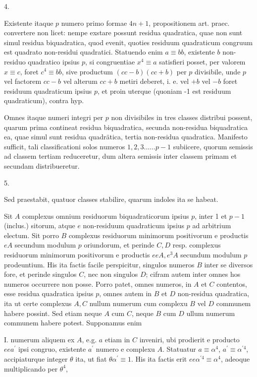 \documentclass[10pt]{article}
\begin{document}
4.

Existente itaque \(p\) numero primo formae \(4 n+1\), propositionem art. praec. convertere non licet: nempe exstare possunt residua quadratica, quae non sunt simul residua biquadratica, quod evenit, quoties residuum quadraticum congruum est quadrato non-residui quadratici. Statuendo enim \(a \equiv b b\), existente \(b\) non-
residuo quadratico ipsius \(p\), si congruentiae \(x^{4} \equiv a\) satisfieri posset, per valorem \(x \equiv c\), foret \(c^{4} \equiv b b\), sive productum \((c c-b)(c c+b)\) per \(p\) divisibile, unde \(p\) vel factorem \(c c-b\) vel alterum \(c c+b\) metiri deberet, i. e. vel \(+b\) vel \(-b\) foret residuum quadraticum ipsius \(p\), et proin uterque (quoniam -1 est residuum quadraticum), contra hyp.

Omnes itaque numeri integri per \(p\) non divisibiles in tres classes distribui possent, quarum prima contineat residua biquadratica, secunda non-residua biquadratica ea, quae simul sunt residua quadrätica, tertia non-residua quadratica. Manifesto sufficit, tali classificationi solos numeros \(1,2,3 \ldots \ldots p-1\) subiicere, quorum semissis ad classem tertiam reduceretur, dum altera semissis inter classem primam et secundam distribueretur.

5.

Sed praestabit, quatuor classes stabilire, quarum indoles ita se habeat.

Sit \(A\) complexus omnium residuorum biquadraticorum ipsius \(p\), inter 1 et \(p-1\) (inclus.) sitorum, atque \(e\) non-residuum quadraticum ipsius \(p\) ad arbitrium electum. Sit porro \(B\) complexus residuorum minimorum positivorum e productis \(e A\) secundum modulum \(p\) oriundorum, et perinde \(C, D\) resp. complexus residuorum minimorum positivorum e productis \(e e A, e^{3} A\) secundum modulum \(p\) prodeuntium. His ita factis facile perspicitur, singulos numeros \(B\) inter se diversos fore, et perinde singulos \(C\), nec non singulos \(D\); cifram autem inter omnes hos numeros occurrere non posse. Porro patet, omnes numeros, in \(A\) et \(C\) contentos, esse residua quadratica ipsius \(p\), omnes autem in \(B\) et \(D\) non-residua quadratica, ita ut certe complexus \(A, C\) nullum numerum cum complexu \(B\) vel \(D\) communem habere possint. Sed etiam neque \(A\) cum \(C\), neque \(B\) cum \(D\) ullum numerum communem habere potest. Supponamus enim

I. numerum aliquem ex \(A\), e.g. \(a\) etiam in \(C\) inveniri, ubi prodierit e producto \(e e a^{\prime}\) ipsi congruo, existente \(a^{\prime}\) numero e complexu \(A\). Statuatur \(a \equiv \alpha^{4}\), \(a^{\prime} \equiv \alpha^{\prime 4}\), accipiaturque integer \(\theta\) ita, ut fiat \(\theta \alpha^{\prime} \equiv 1\). His ita factis erit \(e e \alpha^{\prime 4} \equiv \alpha^{4}\), adeoque multiplicando per \(\theta^{4}\),
\end{document}
